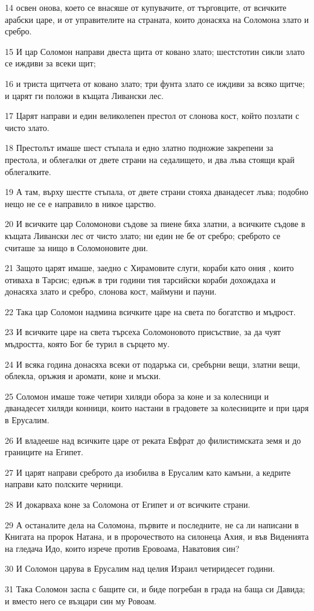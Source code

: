 \par 14 освен онова, което се внасяше от купувачите, от търговците, от всичките арабски царе, и от управителите на страната, които донасяха на Соломона злато и сребро.
\par 15 И цар Соломон направи двеста щита от ковано злато; шестстотин сикли злато се иждиви за всеки щит;
\par 16 и триста щитчета от ковано злато; три фунта злато се иждиви за всяко щитче; и царят ги положи в къщата Ливански лес.
\par 17 Царят направи и един великолепен престол от слонова кост, който позлати с чисто злато.
\par 18 Престолът имаше шест стъпала и едно златно подножие закрепени за престола, и облегалки от двете страни на седалището, и два лъва стоящи край облегалките.
\par 19 А там, върху шестте стъпала, от двете страни стояха дванадесет лъва; подобно нещо не се е направило в никое царство.
\par 20 И всичките цар Соломонови съдове за пиене бяха златни, а всичките съдове в къщата Ливански лес от чисто злато; ни един не бе от сребро; среброто се считаше за нищо в Соломоновите дни.
\par 21 Защото царят имаше, заедно с Хирамовите слуги, кораби като ония , които отиваха в Тарсис; еднъж в три години тия тарсийски кораби дохождаха и донасяха злато и сребро, слонова кост, маймуни и пауни.
\par 22 Така цар Соломон надмина всичките царе на света по богатство и мъдрост.
\par 23 И всичките царе на света търсеха Соломоновото присъствие, за да чуят мъдростта, която Бог бе турил в сърцето му.
\par 24 И всяка година донасяха всеки от подаръка си, сребърни вещи, златни вещи, облекла, оръжия и аромати, коне и мъски.
\par 25 Соломон имаше тоже четири хиляди обора за коне и за колесници и дванадесет хиляди конници, които настани в градовете за колесниците и при царя в Ерусалим.
\par 26 И владееше над всичките царе от реката Евфрат до филистимската земя и до границите на Египет.
\par 27 И царят направи среброто да изобилва в Ерусалим като камъни, а кедрите направи като полските черници.
\par 28 И докарваха коне за Соломона от Египет и от всичките страни.
\par 29 А останалите дела на Соломона, първите и последните, не са ли написани в Книгата на пророк Натана, и в пророчеството на силонеца Ахия, и във Виденията на гледача Идо, които изрече против Еровоама, Наватовия син?
\par 30 И Соломон царува в Ерусалим над целия Израил четиридесет години.
\par 31 Така Соломон заспа с бащите си, и биде погребан в града на баща си Давида; и вместо него се възцари син му Ровоам.

